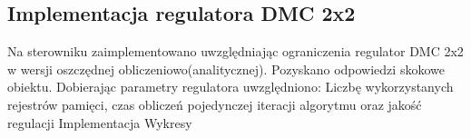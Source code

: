 \subsection{Implementacja regulatora DMC 2x2}
\label{lab:zad4}


%    

Na	sterowniku	zaimplementowano	uwzględniając	ograniczenia	regulator	DMC	
2x2	w	wersji	oszczędnej	obliczeniowo(analitycznej). Pozyskano	odpowiedzi	
skokowe	obiektu.	Dobierając	parametry	regulatora	uwzględniono:
Liczbę	wykorzystanych	rejestrów	pamięci,	czas	obliczeń	pojedynczej	iteracji	
algorytmu	oraz	jakość	regulacji
Implementacja	
Wykresy

\newpage
